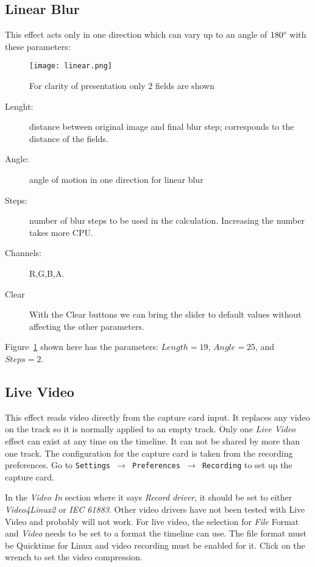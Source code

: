 \subsection{Linear Blur}%
\label{sub:linear_blur}

This effect acts only in one direction which can vary up to an angle of $180\degree$ with these parameters:

\begin{figure}[htpb]
	\centering
	\texttt{[image: linear.png]}
	\caption{For clarity of presentation only 2 fields are shown}
	\label{fig:linear}
\end{figure}

\begin{description}
    \item[Lenght:] distance between original image and final blur step; corresponds to the distance of the fields.
    \item[Angle:] angle of motion in one direction for linear blur
    \item[Steps:] number of blur steps to be used in the calculation. Increasing the number takes more CPU.
    \item[Channels:] R,G,B,A.
    \item[Clear] With the Clear buttons we can bring the slider to default values without affecting the other parameters.
\end{description}

Figure~\ref{fig:linear} shown here has the parameters: $Length=19$, $Angle=25$, and $Steps=2$.

\subsection{Live Video}%
\label{sub:live_video}

This effect reads video directly from the capture card input. It replaces any video on the track so it is normally applied to an empty track. Only one \textit{Live Video} effect can exist at any time on the timeline. It can not be shared by more than one track. The configuration for the capture card is taken from the recording preferences. Go to \texttt{Settings $\rightarrow$ Preferences $\rightarrow$ Recording} to set up the capture card.

In the \textit{Video In} section where it says \textit{Record driver}, it should be set to either \textit{Video4Linux2} or \textit{IEC 61883}. Other video drivers have not been tested with Live Video and probably will not work. For live video, the selection for \textit{File} Format and \textit{Video} needs to be set to a format the timeline can use. The file format must be Quicktime for Linux and video recording must be enabled for it. Click on the wrench to set the video compression.

